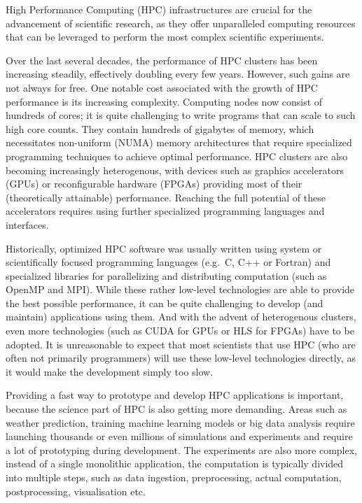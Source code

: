 High Performance Computing (HPC) infrastructures are crucial for the advancement of scientific
research, as they offer unparalleled computing resources that can be leveraged to perform the most
complex scientific experiments.

Over the last several decades, the performance of HPC clusters has been increasing steadily,
effectively doubling every few years. However, such gains are not always for free. One notable cost
associated with the growth of HPC performance is its increasing complexity. Computing nodes now
consist of hundreds of cores; it is quite challenging to write programs that can scale to such
high core counts. They contain hundreds of gigabytes of memory, which necessitates non-uniform
(NUMA) memory architectures that require specialized programming techniques to achieve optimal
performance. HPC clusters are also becoming increasingly heterogenous, with devices such as
graphics accelerators (GPUs) or reconfigurable hardware (FPGAs) providing most of their
(theoretically attainable) performance. Reaching the full potential of these accelerators requires
using further specialized programming languages and interfaces.

Historically, optimized HPC software was usually written using system or scientifically focused
programming languages (e.g.~C, C++ or Fortran) and specialized libraries for parallelizing and
distributing
computation (such as OpenMP and MPI). While these rather low-level technologies are able to provide
the best possible performance, it can be quite challenging to develop (and maintain) applications
using them. And with the advent of heterogenous clusters, even more technologies (such as CUDA for
GPUs or HLS for FPGAs) have to be adopted. It is unreasonable to expect that most scientists that
use HPC (who are often not primarily programmers) will use these low-level technologies directly,
as it would make the development simply too slow.

Providing a fast way to prototype and develop HPC applications is important, because the science
part of HPC is also getting more demanding. Areas such as weather prediction, training machine
learning models or big data analysis require launching thousands or even millions of simulations
and experiments and require a lot of prototyping during development. The experiments are also more
complex, instead of a single monolithic application, the computation is typically divided into
multiple steps, such as data ingestion, preprocessing, actual computation, postprocessing,
visualisation etc.

